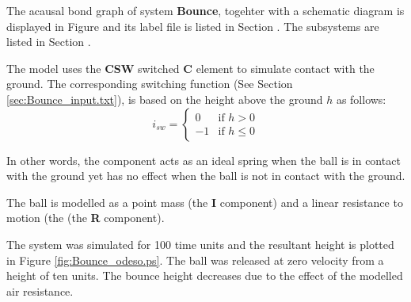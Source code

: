 

   The acausal bond graph of system \textbf{Bounce}, togehter with a
   schematic diagram is
   displayed in Figure  and its label
   file is listed in Section .
   The subsystems are listed in Section .

The model uses the {\bf CSW} switched {\bf C} element to simulate
contact with the ground. The corresponding switching function (See
Section \ref{sec:Bounce_input.txt}), is based on the height above the
ground $h$ as follows:
\begin{equation}
i_{sw} = 
  \begin{cases}
    0 & \text{if $h > 0$}\\
    -1 & \text{if $h \le 0$}
  \end{cases}
\end{equation}

In other words, the component acts as an ideal spring when the ball is
in contact with the ground yet has no effect when the ball is not in
contact with the ground.

The ball is modelled as a point mass (the \textbf{I} component) and  a
linear resistance to motion (the  (the \textbf{R} component).

The system was simulated for 100 time units and the resultant height
is plotted in Figure \ref{fig:Bounce_odeso.ps}. The ball was released at zero
velocity from a height of ten units. The bounce height decreases due to
the effect of the modelled air resistance.

